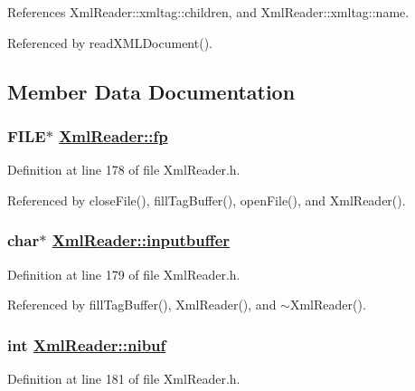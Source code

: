 References Xml\-Reader::xmltag::children, and Xml\-Reader::xmltag::name.

Referenced by read\-XMLDocument().

\subsection{Member Data Documentation}
\hypertarget{classXmlReader_p0}{
\subsubsection[fp]{\setlength{\rightskip}{0pt plus 5cm}FILE$\ast$ \hyperlink{classXmlReader_p0}{Xml\-Reader::fp}}}
\label{classXmlReader_p0}




Definition at line 178 of file Xml\-Reader.h.

Referenced by close\-File(), fill\-Tag\-Buffer(), open\-File(), and Xml\-Reader().\hypertarget{classXmlReader_p1}{
\subsubsection[inputbuffer]{\setlength{\rightskip}{0pt plus 5cm}char$\ast$ \hyperlink{classXmlReader_p1}{Xml\-Reader::inputbuffer}}}
\label{classXmlReader_p1}




Definition at line 179 of file Xml\-Reader.h.

Referenced by fill\-Tag\-Buffer(), Xml\-Reader(), and $\sim$Xml\-Reader().\hypertarget{classXmlReader_p3}{
\subsubsection[nibuf]{\setlength{\rightskip}{0pt plus 5cm}int \hyperlink{classXmlReader_p3}{Xml\-Reader::nibuf}}}
\label{classXmlReader_p3}




Definition at line 181 of file Xml\-Reader.h.


